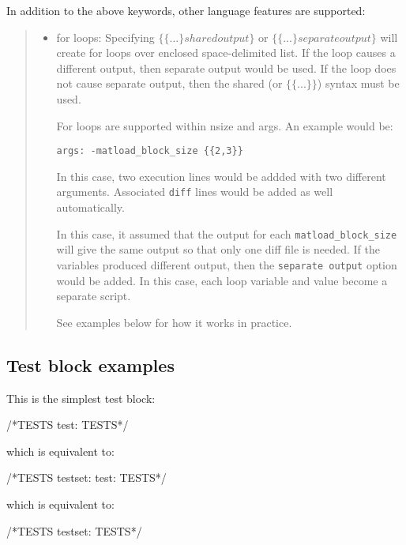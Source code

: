 In addition to the above keywords, other language features are
supported:
%
\begin{quote}
%
\begin{itemize}

\item for loops:  Specifying $\{\{ ... \}shared output\} $ 
      or $\{\{ ... \}separate output\} $ 
      will create for loops over enclosed space-delimited list.  
      If the loop causes a different output, then separate output would
      be used.  If the loop does not cause separate output, then the
      shared (or $\{\{ ... \}\} $) syntax must be used.

For loops are supported within nsize and args.  An example would be:
%
\begin{lstlisting}
args: -matload_block_size {{2,3}}
\end{lstlisting}

In this case, two execution lines would be addded with two different
arguments.  Associated \lstinline{diff} lines would be added as well
automatically.

In this case, it assumed that the output for each
\lstinline{matload_block_size} will give the same output so
that only one diff file is needed.  If the variables
produced different output, then the \lstinline{separate output} option would be added.  In this case, each loop
variable and value become a separate script.

See examples below for how it works in practice.

\end{itemize}

\end{quote}


\subsection{Test block examples%
  \label{test-block-examples}%
}


This is the simplest test block:
%
\begin{outputlisting}
/*TESTS
  test: 
TESTS*/
\end{outputlisting}
which is equivalent to:
\begin{outputlisting}
/*TESTS
  testset: 
    test: 
TESTS*/
\end{outputlisting}
which is equivalent to:
\begin{outputlisting}
/*TESTS
  testset: 
TESTS*/
\end{outputlisting}

